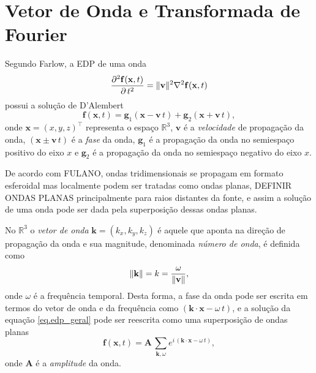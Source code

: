 \chapter{Vetor de Onda e Transformada de Fourier}
Segundo Farlow, a EDP de uma onda 
\begin{equation}\label{eq.edp_geral}
\frac{\partial^2\mathbf{f}(\mathbf{x},t)}{\partial\,t^2}=\lVert\mathbf{v}\rVert^2\nabla^2\mathbf{f}(\mathbf{x},t)
\end{equation}
possui a solu\c{c}\~ao de D'Alembert
\begin{equation}
\mathbf{f}(\mathbf{x},t)=\mathbf{g}_1(\mathbf{x}-\mathbf{v}\,t)+\mathbf{g}_2(\mathbf{x}+\mathbf{v}\,t),
\end{equation}
onde $\mathbf{x}=(x,y,z)^\top$ representa o espa\c{c}o $\mathbb{R}^3$, $\mathbf{v}$ \'e a \textit{velocidade} de propaga\c{c}\~ao da onda, $(\mathbf{x}\pm\mathbf{v}\,t)$ \'e a \textit{fase} da onda, $\mathbf{g}_1$ \'e a propaga\c{c}\~ao da onda no semiespa\c{c}o positivo do eixo $x$ e $\mathbf{g}_2$ \'e a propaga\c{c}\~ao da onda no semiespa\c{c}o negativo do eixo $x$.

De acordo com FULANO, ondas tridimensionais se propagam em formato esferoidal mas localmente podem ser tratadas como ondas planas, DEFINIR ONDAS PLANAS principalmente para raios distantes da fonte, e assim a solu\c{c}\~ao de uma onda pode ser dada pela superposi\c{c}\~ao dessas ondas planas.

No $\mathbb{R}^3$ o \textit{vetor de onda} $\mathbf{k}=(k_x,k_y,k_z)$ \'e aquele que aponta na dire\c{c}\~ao de propaga\c{c}\~ao da onda e sua magnitude, denominada \textit{n\'umero de onda}, \'e definida como 
\begin{equation}
\lVert\mathbf{k}\rVert=k=\frac{\omega}{\lVert\mathbf{v}\rVert},
\end{equation}
onde $\omega$ \'e a frequ\^encia temporal. Desta forma, a fase da onda pode ser escrita em termos do vetor de onda e da frequ\^encia como $(\mathbf{k}\cdot\mathbf{x}-\omega\,t)$, e a solu\c{c}\~ao da equa\c{c}\~ao \ref{eq.edp_geral} pode ser reescrita como uma superposi\c{c}\~ao de ondas planas
\begin{equation}
\mathbf{f}(\mathbf{x},t)=\mathbf{A}\,\sum_{\mathbf{k},\omega}{e^{i\,(\mathbf{k}\cdot\mathbf{x}-\omega\,t)}},
\end{equation}
onde $\mathbf{A}$ \'e a \textit{amplitude} da onda.

